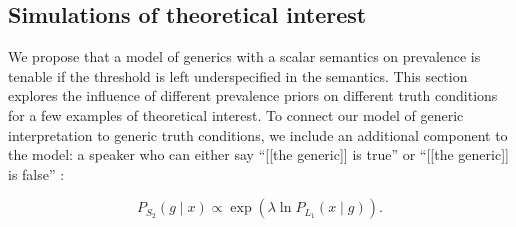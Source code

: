 \documentclass[10pt,letterpaper]{article}
\begin{document}
%

\subsection{Simulations of theoretical interest}
\label{sec:simulations}

We propose that a model of generics with a scalar semantics on prevalence is tenable if the threshold is left underspecified in the semantics. This section explores the influence of different prevalence priors on different truth conditions for a few examples of theoretical interest. To connect our model of generic interpretation to generic truth conditions, we include an additional component to the model: a speaker who can either say ``[[the generic]] is true'' or ``[[the generic]] is false'' \cite{Degen2014}:

\begin{equation} 
P_{S_{2}}(g \mid x) \propto \exp(\lambda \ln {P_{L_{1}}(x \mid g)}).
\label{eq:S2}
\end{equation}
\end{document}
